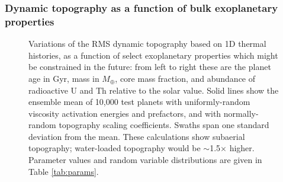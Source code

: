 \documentclass[trackchanges]{aastex63}
\newcommand{\Raieff}{Ra$_{i, {\rm eff}}$~}
\begin{document}








\subsubsection{Dynamic topography as a function of bulk exoplanetary properties}
\label{sec:results-parameters}

\begin{figure}
    \centering
    \caption{Variations of the RMS dynamic topography based on 1D thermal histories, as a function of select exoplanetary properties which might be constrained in the future: from left to right these are the planet age in Gyr, mass in $M_\oplus$, core mass fraction, and abundance of radioactive U and Th relative to the solar value. Solid lines show the ensemble mean of 10,000 test planets with uniformly-random viscosity activation energies and prefactors, and with normally-random topography scaling coefficients. Swaths span one standard deviation from the mean. These calculations show subaerial topography; water-loaded topography would be $\sim$1.5$\times$ higher. Parameter values and random variable distributions are given in Table \ref{tab:params}.
    }
    \label{fig:1D-h-scale}
\end{figure}
\end{document}
